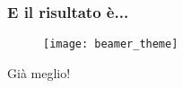 \begin{frame}
 
 \frametitle{E il risultato è...}
 
 \begin{figure}[h]
  \centering
  \texttt{[image: beamer\_theme]}
  \label{img:maketitle}
 \end{figure}

 Già meglio!
\end{frame}
